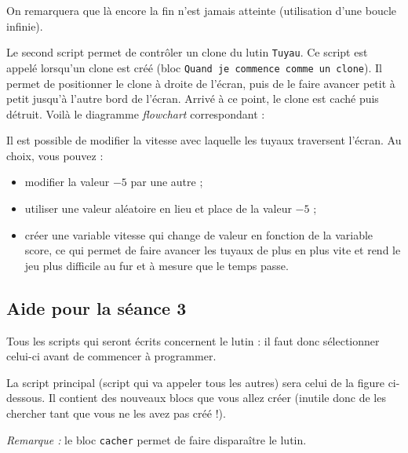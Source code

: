 

On remarquera que là encore la fin n'est jamais atteinte (utilisation d'une boucle infinie).

Le second script permet de contrôler un clone du lutin \texttt{Tuyau}. Ce script est appelé lorsqu'un clone est créé (bloc \texttt{Quand je commence comme un clone}). Il permet de positionner le clone à droite de l'écran, puis de le faire avancer petit à petit jusqu'à l'autre bord de l'écran. Arrivé à ce point, le clone est caché puis détruit. Voilà le diagramme \emph{flowchart} correspondant :



Il est possible de modifier la vitesse avec laquelle les tuyaux traversent l'écran. Au choix, vous pouvez :
\begin{itemize}
\item modifier la valeur $-5$ par une autre ;
\item utiliser une valeur aléatoire en lieu et place de la valeur $-5$ ;
\item créer une variable vitesse qui change de valeur en fonction de la variable score, ce qui permet de faire avancer les tuyaux de plus en plus vite et rend le jeu plus difficile au fur et à mesure que le temps passe.
\end{itemize}



\subsection{Aide pour la séance 3}\label{aide_seanceScratch3}


Tous les scripts qui seront écrits concernent le lutin : il faut donc sélectionner celui-ci avant de commencer à programmer.

\vspace{6pt}

La script principal (script qui va appeler tous les autres) sera celui de la figure ci-dessous. Il contient des nouveaux blocs que vous allez créer (inutile donc de les chercher tant que vous ne les avez pas créé !).


\emph{Remarque :} le bloc \texttt{cacher} permet de faire disparaître le lutin.

